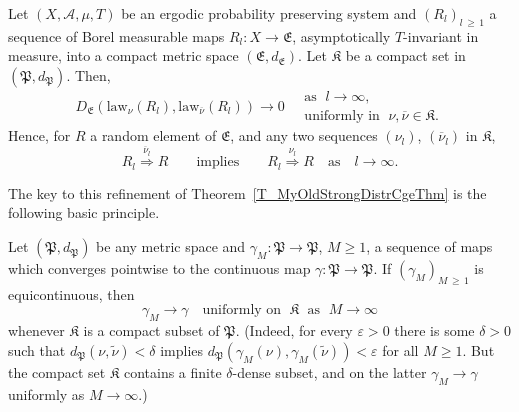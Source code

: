 \documentclass[AHL,Unicode,longabstracts]{cedram}
\newcommand{\clA}{\mathcal{A}}
\newcommand{\law}{\mathrm{law}}
\newcommand{\frkK}{\mathfrak{K}}
\newcommand{\frkP}{\mathfrak{P}}
\newcommand{\frkE}{\mathfrak{E}}
\begin{document}
\begin{theo}\label{T_HTSforVaryingMeasures}
Let $(X,\clA,\mu,T)$ be an ergodic probability preserving system and $(R_{l})_{l\,\geq\,1}$ a sequence of Borel measurable maps $R_{l}:X\rightarrow\frkE$, asymptotically $T$-invariant in measure, into a compact metric space $(\frkE,d_{\frkE})$. Let $\frkK$ be a compact set in $(\frkP,d_{\frkP})$. Then,
\begin{equation}\label{Eq_UniformCgeOnCptSetNew}
D_{\frkE}\left(\law_{\nu}(R_{l}),\law_{\overline{\nu}} (R_{l})\right)\longrightarrow0\quad
\begin{aligned}
\text{as }\;l\rightarrow\infty,\\
\text{uniformly in }\;\nu,\overline{\nu}\in\frkK.
\end{aligned}
\end{equation}
Hence, for $R$ a random element of $\frkE$, and any two sequences $(\nu_{l})$, $(\overline{\nu}_{l})$ in $\frkK$,
\begin{equation}\label{Eq_UniformCgeOnCptSetU2}
R_{l}\overset{\overline{\nu}_{l}}{\Longrightarrow}R\qquad \text{implies}\qquad R_{l}\overset{\nu_{l}}{\Longrightarrow}R\quad\text{as}\quad l\rightarrow
\infty.
\end{equation}
\end{theo}



The key to this refinement of Theorem~\ref{T_MyOldStrongDistrCgeThm} is the following basic principle.

\begin{rema}\label{R_UnifCgeByEquiCty}
Let $(\frkP,d_{\frkP})$ be any metric space and $\gamma _{M}:\frkP\rightarrow\frkP$, $M\geq1$, a sequence of maps which converges pointwise to the continuous map $\gamma:\frkP\rightarrow \frkP$. If $(\gamma_{M})_{M\,\geq\,1}$ is equicontinuous, then
\[
\gamma_{M}\longrightarrow\gamma\quad\text{uniformly on }\;\frkK\;\text{ as }\;M\rightarrow\infty
\]
whenever $\frkK$ is a compact subset of $\frkP$. (Indeed, for every $\varepsilon>0$ there is some $\delta>0$ such that $d_{\frkP} (\nu,\widetilde{\nu})<\delta$ implies $d_{\frkP}(\gamma_{M}(\nu),\gamma_{M}(\widetilde{\nu}))<\varepsilon$ for all $M\geq1$. But the compact set $\frkK$ contains a finite $\delta$-dense subset, and on the latter $\gamma_{M}\longrightarrow\gamma$ uniformly as $M\rightarrow\infty$.)
\end{rema}
\end{document}
